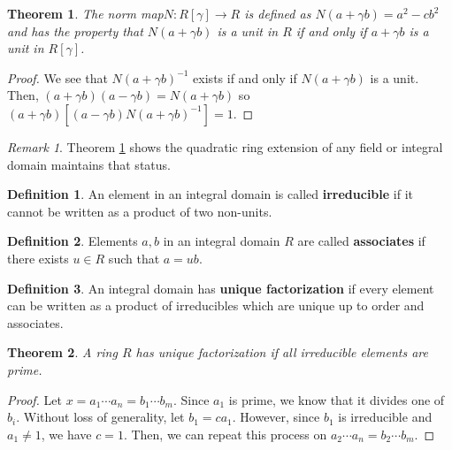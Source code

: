 \documentclass[11pt]{article}
\newtheorem{theorem}{Theorem}[definition]
\theoremstyle{definition}
\newtheorem{definition}{Definition}[section]
\theoremstyle{remark}
\newtheorem{remark}{Remark}[definition]
\begin{document}
\begin{theorem}
    \label{thm:norm map}
    The norm map\footnotemark $N:R[\gamma]\to R$ is defined as
    $N(a+\gamma b)=a^2-cb^2$ and has the property that $N(a+\gamma b)$ is a
    unit in $R$ if and only if $a+\gamma b$ is a unit in $R[\gamma]$.
\end{theorem}

\begin{proof}
    We see that $N(a+\gamma b)^{-1}$ exists if and only if $N(a+\gamma b)$ is a unit.
    Then, $(a+\gamma b)(a-\gamma b)=N(a+\gamma b)$ so
    $(a+\gamma b)\left[(a-\gamma b)N(a+\gamma b)^{-1}\right]=1$.
\end{proof}

\begin{remark}
    Theorem \ref{thm:norm map} shows the quadratic ring extension of any field
    or integral domain maintains that status.
\end{remark}

\begin{definition}
    An element in an integral domain is called \textbf{irreducible} if it
    cannot be written as a product of two non-units.
\end{definition}

\begin{definition}
    Elements $a,b$ in an integral domain $R$ are called \textbf{associates} if
    there exists $u\in R$ such that $a=ub$.
\end{definition}

\begin{definition}
    \label{def:unique factorization}
    An integral domain has \textbf{unique factorization} if every element can
    be written as a product of irreducibles which are unique up to order and
    associates.
\end{definition}

\begin{theorem}
    \label{thm:unique factorization}
    A ring $R$ has unique factorization if all irreducible elements are prime.
\end{theorem}

\begin{proof}
    Let $x=a_1\cdots a_n=b_1\cdots b_m$.
    Since $a_1$ is prime, we know that it divides one of $b_i$.
    Without loss of generality, let $b_1=ca_1$.
    However, since $b_1$ is irreducible and $a_1\neq 1$, we have $c=1$.
    Then, we can repeat this process on $a_2\cdots a_n=b_2\cdots b_m$.
\end{proof}
\end{document}
